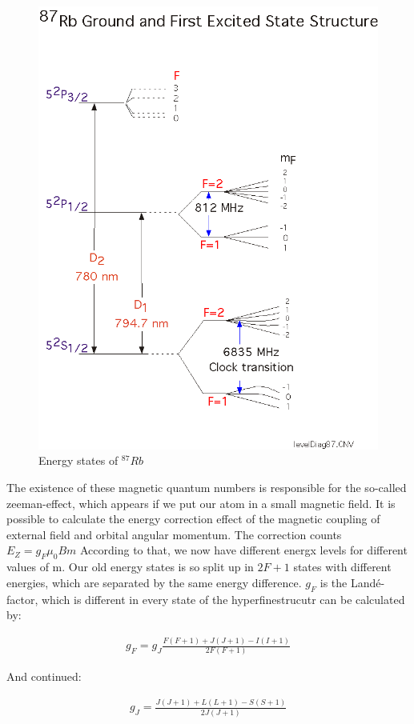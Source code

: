 \begin{figure}[htbp] 
     \includegraphics[scale=0.7]{level87.png}
  \caption{Energy states of $^{87}Rb$}
  \label{states}
\end{figure}

The existence of these magnetic quantum numbers is responsible for the so-called zeeman-effect, which appears if we put our atom in a small magnetic field. It is possible to calculate the energy correction effect of the magnetic coupling of external field and orbital angular momentum. The correction counts $E_Z=g_F\mu_0 Bm$
According to that, we now have different energx levels for different values of m. Our old energy states is so split up in $2F+1$ states with different energies, which are separated by the same energy difference. $g_F$ is the Landé-factor, which is different in every state of the hyperfinestrucutr can be calculated by:

\begin{align}
g_F=g_J \frac{F\left(F+1\right)+J\left(J+1\right)-I\left(I+1\right)}{2F\left(F+1\right)}
\end{align}

And continued:

\begin{align}
g_J=\frac{J\left(J+1\right)+L\left(L+1\right)-S\left(S+1\right)}{2J\left(J+1\right)}
\end{align}